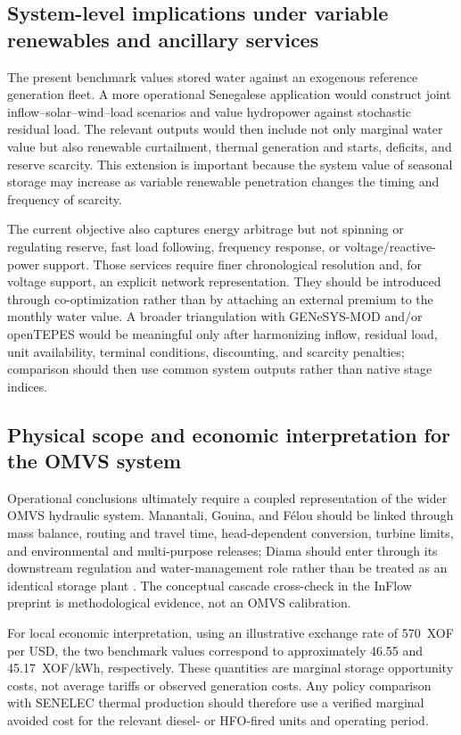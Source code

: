 \documentclass[11pt,a4paper]{article}
\begin{document}
\subsection{System-level implications under variable renewables and ancillary services}
The present benchmark values stored water against an exogenous reference generation
fleet. A more operational Senegalese application would construct joint
inflow--solar--wind--load scenarios and value hydropower against stochastic residual
load. The relevant outputs would then include not only marginal water value but also
renewable curtailment, thermal generation and starts, deficits, and reserve scarcity.
This extension is important because the system value of seasonal storage may increase
as variable renewable penetration changes the timing and frequency of scarcity.

The current objective also captures energy arbitrage but not spinning or regulating
reserve, fast load following, frequency response, or voltage/reactive-power support.
Those services require finer chronological resolution and, for voltage support, an
explicit network representation. They should be introduced through co-optimization
rather than by attaching an external premium to the monthly water value. A broader
triangulation with GENeSYS-MOD and/or openTEPES \cite{loeffler2017,opentepes2022}
would be meaningful only after harmonizing inflow, residual load, unit availability,
terminal conditions, discounting, and scarcity penalties; comparison should then use
common system outputs rather than native stage indices.

\subsection{Physical scope and economic interpretation for the OMVS system}
Operational conclusions ultimately require a coupled representation of the wider OMVS
hydraulic system. Manantali, Gouina, and F\'elou should be linked through mass balance,
routing and travel time, head-dependent conversion, turbine limits, and environmental
and multi-purpose releases; Diama should enter through its downstream regulation and
water-management role rather than be treated as an identical storage plant
\cite{loucks2017}. The conceptual cascade cross-check in the InFlow preprint
\cite{affognon2026inflow} is methodological evidence, not an OMVS calibration.

For local economic interpretation, using an illustrative exchange rate of
570~XOF per USD, the two benchmark values correspond to approximately 46.55 and
45.17~XOF/kWh, respectively. These quantities are marginal storage opportunity
costs, not average tariffs or observed generation costs. Any policy comparison with
SENELEC thermal production should therefore use a verified marginal avoided cost
for the relevant diesel- or HFO-fired units and operating period.
\end{document}
